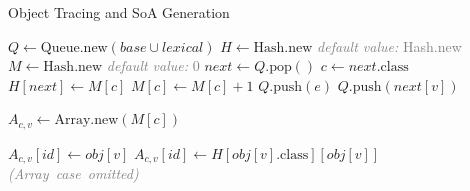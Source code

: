 \documentclass[preprint]{sigplanconf}
\begin{document}
\begin{algorithm}[!h]
\caption{Object Tracing and SoA Generation}
\label{CHalgorithm}
\begin{algorithmic}[1]
\State $\mathit{Q} \gets \mbox{Queue.new}(\mathit{base} \cup \mathit{lexical})$
\State $H \gets \mbox{Hash.new}$ \hfill \textcolor{gray}{\textit{default value:} Hash.new}
\State $M \gets \mbox{Hash.new}$ \hfill \textcolor{gray}{\textit{default value:} 0}
    \State $\mathit{next} \gets Q.\mbox{pop}()$
    \State $c \gets \mathit{next}.\mbox{class}$
        \State $H[\mathit{next}] \gets M[c]$
        \State $M[c] \gets M[c] + 1$
                \State $Q.\mbox{push}(e)$
            \EndFor
        \Else
                \State $Q.\mbox{push}(\mathit{next}[v])$
            \EndFor
        \EndIf
    \EndIf
\EndWhile

        \State $A_{c,v} \gets \mbox{Array.new}(M[c])$
    \EndFor

                \State $A_{c,v}[\mathit{id}] \gets \mathit{obj}[v]$
            \Else
                \State $A_{c,v}[\mathit{id}] \gets H[\mathit{obj}[v].\mbox{class}][\mathit{obj}[v]]$
            \EndIf
        \EndFor
    \EndFor
\EndFor
\State \mbox{\textit{\textcolor{gray}{(Array case omitted)}}}
\EndProcedure
\end{algorithmic}
\end{algorithm}
\end{document}
